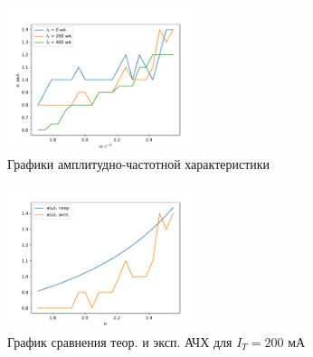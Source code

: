 \begin{figure}[H]
  \centering
	\includegraphics[width=0.5\textwidth]{figures/a_omega.pdf}
	\caption{Графики амплитудно-частотной характеристики}
  \label{fig:a_omega}
\end{figure}

\begin{figure}[H]
  \centering
	\includegraphics[width=0.5\textwidth]{figures/theor_vs_emp.pdf}
	\caption{График сравнения теор. и эксп. АЧХ для $I_T = 200$ мА}
  \label{fig:theor_vs_emp}
\end{figure}

